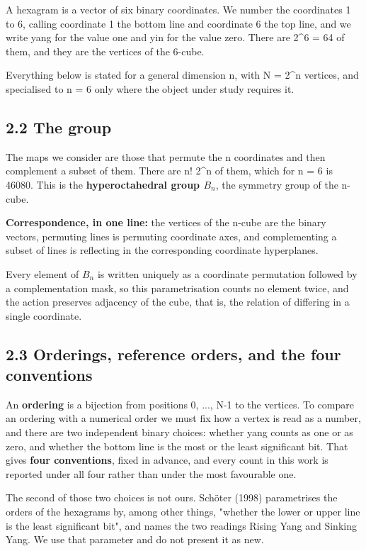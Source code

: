 \documentclass[11pt,a4paper]{article}
\begin{document}
A hexagram is a vector of six binary coordinates. We number the coordinates 1 to 6, calling coordinate 1 the bottom line and coordinate 6 the top line, and we write yang for the value one and yin for the value zero. There are 2\textasciicircum{}6 = 64 of them, and they are the vertices of the 6-cube.

Everything below is stated for a general dimension n, with N = 2\textasciicircum{}n vertices, and specialised to n = 6 only where the object under study requires it.

\subsection*{2.2 The group}

The maps we consider are those that permute the n coordinates and then complement a subset of them. There are n! 2\textasciicircum{}n of them, which for n = 6 is 46080. This is the \textbf{hyperoctahedral group $B_n$}, the symmetry group of the n-cube.

\textbf{Correspondence, in one line:} the vertices of the n-cube are the binary vectors, permuting lines is permuting coordinate axes, and complementing a subset of lines is reflecting in the corresponding coordinate hyperplanes.

Every element of $B_n$ is written uniquely as a coordinate permutation followed by a complementation mask, so this parametrisation counts no element twice, and the action preserves adjacency of the cube, that is, the relation of differing in a single coordinate.

\subsection*{2.3 Orderings, reference orders, and the four conventions}

An \textbf{ordering} is a bijection from positions 0, ..., N-1 to the vertices. To compare an ordering with a numerical order we must fix how a vertex is read as a number, and there are two independent binary choices: whether yang counts as one or as zero, and whether the bottom line is the most or the least significant bit. That gives \textbf{four conventions}, fixed in advance, and every count in this work is reported under all four rather than under the most favourable one.

The second of those two choices is not ours. Schöter (1998) parametrises the orders of the hexagrams by, among other things, "whether the lower or upper line is the least significant bit", and names the two readings Rising Yang and Sinking Yang. We use that parameter and do not present it as new.
\end{document}
